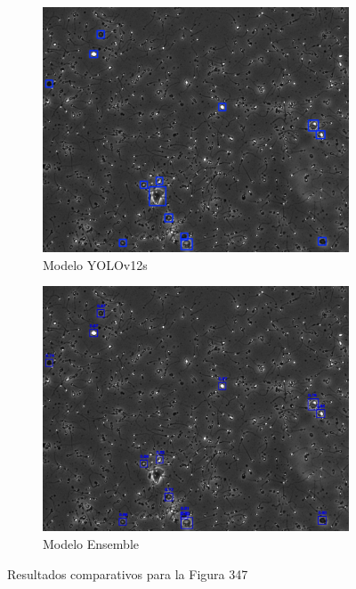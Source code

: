 \documentclass[12pt,a4paper,onecolumn,oneside]{report}
\begin{document}
\begin{figure}[H]
  \vspace{0.3cm} 
  
  \begin{subfigure}[b]{0.48\textwidth}
    \centering
    \includegraphics[width=\textwidth]{figuras/evaluacion_cualitativa/347/347_v12.jpg}
    \caption{Modelo YOLOv12s}
    \label{fig:yolov12s_image_347}
  \end{subfigure}
  \hfill
  \begin{subfigure}[b]{0.48\textwidth}
    \centering
    \includegraphics[width=\textwidth]{figuras/evaluacion_cualitativa/347/347_ensemble.jpg}
    \caption{Modelo Ensemble}
    \label{fig:ensemble_image_347}
  \end{subfigure}
  
  \caption{Resultados comparativos para la Figura 347}
  \label{fig:347}
\end{figure}
\end{document}
